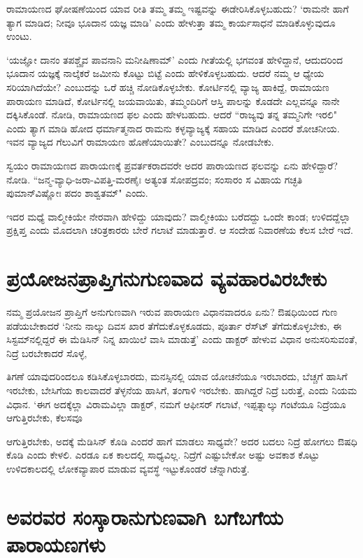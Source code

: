 ರಾಮಾಯಣದ ಘೋಷಣೆಯಿಂದ ಯಾವ ರೀತಿ ತಮ್ಮ ತಮ್ಮ ಇಷ್ಟವನ್ನು ಈಡೇರಿಸಿಕೊಳ್ಳಬಹುದು? `ರಾಮನೇ ಹಾಗೆ ತ್ಯಾಗ ಮಾಡಿದ; ನೀವೂ ಭೂದಾನ ಯಜ್ಞ ಮಾಡಿ' ಎಂದು ಹೇಳುತ್ತಾ ತಮ್ಮ ಕಾರ್ಯಸಾಧನೆ ಮಾಡಿಕೊಳ್ಳುವುದೂ ಉಂಟು. 

`ಯಜ್ಞೋ ದಾನಂ ತಪಶ್ಚೈವ\label{172} ಪಾವನಾನಿ ಮನೀಷಿಣಾಮ್‍' ಎಂದು ಗೀತೆಯಲ್ಲಿ ಭಗವಂತ ಹೇಳಿದ್ದಾನೆ, ಆದುದರಿಂದ ಭೂದಾನ ಯಜ್ಞಕ್ಕೆ ನಾಲ್ಕೆಕರೆ ಜಮೀನು ಕೊಟ್ಟು ಬಿಟ್ಟೆ ಎಂದು ಹೇಳಿಕೊಳ್ಳಬಹುದು. ಆದರೆ ನಮ್ಮ ಆ ಧ್ಯೇಯ ಸರಿಯಾಗಿದೆಯೇ? ಎಂಬುದನ್ನು ಒರೆ ಹಚ್ಚಿ ನೋಡಿಕೊಳ್ಳಬೇಕು. ಕೋರ್ಟಿನಲ್ಲಿ ವ್ಯಾಜ್ಯ ಹಾಕಿದ್ದೆ, ರಾಮಾಯಣ ಪಾರಾಯಣ ಮಾಡಿದೆ, ಕೋರ್ಟಿನಲ್ಲಿ ಜಯವಾಯಿತು, ತಮ್ಮಂದಿರಿಗೆ ಆಸ್ತಿ ಪಾಲನ್ನು ಕೊಡದೇ ಎಲ್ಲವನ್ನೂ ನಾನೇ ದಕ್ಕಿಸಿಕೊಂಡೆ. ನೋಡಿ, ರಾಮಾಯಣದ ಫಲ ಎಂದು ಹೇಳಬಹುದು. ಆದರೆ ``ರಾಜ್ಯವು ತನ್ನ ತಮ್ಮನಿಗೇ ಇರಲಿ" ಎಂದು ತ್ಯಾಗ ಮಾಡಿ ಹೋದ ಧರ್ಮಾತ್ಮನಾದ ರಾಮನು ಕಳ್ಳವ್ಯಾಜ್ಯಕ್ಕೆ ಸಹಾಯ ಮಾಡಿದ ಎಂದರೆ ಶೋಚನೀಯ. ಇವನ ವ್ಯಾಜ್ಯದ ಗೆಲುವಿಗೆ ರಾಮಾಯಣ ಹೊಣೆಯಾಯಿತೇ? ಎಂಬುದನ್ನೂ ನೋಡಬೇಕು. 


ಸ್ವಯಂ ರಾಮಾಯಣದ ಪಾರಾಯಣಕ್ಕೆ ಪ್ರವರ್ತಕರಾದವರೇ ಅದರ ಪಾರಾಯಣದ ಫಲವನ್ನು ಏನು ಹೇಳಿದ್ದಾರೆ? ನೋಡಿ. ``ಜನ್ಮ-ವ್ಯಾಧಿ-ಜರಾ-ವಿಪತ್ತಿ-ಮರಣೈಃ \label{173} ಅತ್ಯಂತ ಸೋಪದ್ರವಂ; ಸಂಸಾರಂ ಸ ವಿಹಾಯ ಗಚ್ಛತಿ ಪುಮಾನ್‍ವಿಷ್ಣೋಃ ಪದಂ ಶಾಶ್ವತಮ್‍" ಎಂದು. 


ಇದರ ಮಧ್ಯೆ ವಾಲ್ಮೀಕಿಯೇ ನೇರವಾಗಿ ಹೇಳಿದ್ದು ಯಾವುದು? ವಾಲ್ಮೀಕಿಯು ಬರೆದದ್ದು ಒಂದೇ ಕಾಂಡ; ಉಳಿದದ್ದೆಲ್ಲಾ ಪ್ರಕ್ಷಿಪ್ತ ಎಂದು ಮೊದಲಾಗಿ ಚರಿತ್ರಕಾರರು ಬೇರೆ ಗಲಾಟೆ ಮಾಡುತ್ತಾರೆ. ಆ ಸಂದೇಹ ನಿವಾರಣೆಯ ಕೆಲಸ ಬೇರೆ ಇದೆ. 


\section*{ಪ್ರಯೋಜನಪ್ರಾಪ್ತಿಗನುಗುಣವಾದ ವ್ಯವಹಾರವಿರಬೇಕು} 


ನಮ್ಮ ಪ್ರಯೋಜನ ಪ್ರಾಪ್ತಿಗೆ ಅನುಗುಣವಾಗಿ ಇರುವ ಪಾರಾಯಣ ವಿಧಾನವಾದರೂ ಏನು? ಔಷಧಿಯಿಂದ ಗುಣ ಪಡೆಯಬೇಕಾದರೆ `ನೀನು ನಾಲ್ಕು ದಿವಸ ಖಾರ ತೆಗೆದುಕೊಳ್ಳಕೂಡದು, ಪೂರ್ತಾ ರೆಸ್ಟ್‍ ತೆಗೆದುಕೊಳ್ಳಬೇಕು, ಈ ಸಿಸ್ಟಮ್‍ನಲ್ಲಿದ್ದರೆ ಈ ಮೆಡಿಸಿನ್‍ ನಿನ್ನ ಖಾಯಿಲೆ ವಾಸಿ ಮಾಡುತ್ತೆ' ಎಂದು ಡಾಕ್ಟರ್‍ ಹೇಳುವ ವಿಧಾನ ಅನುಸರಿಸುವಂತೆ, ನಿದ್ರೆ ಬರಬೇಕಾದರೆ ಸೊಳ್ಳೆ, 

ತಿಗಣೆ ಯಾವುದರಿಂದಲೂ ಕಡಿಸಿಕೊಳ್ಳಬಾರದು, ಮನಸ್ಸಿನಲ್ಲಿ ಯಾವ ಯೋಚನೆಯೂ ಇರಬಾರದು, ಬೆಚ್ಚಗೆ ಹಾಸಿಗೆ ಇರಬೇಕು, ಬೇಸಿಗೆಯ ಕಾಲವಾದರೆ ತೆಳ್ಳನೆಯ ಹಾಸಿಗೆ, ತಂಗಾಳಿ ಇರಬೇಕು. ಹಾಗಿದ್ದರೆ ನಿದ್ರೆ ಬರುತ್ತೆ, ಎಂದು ನಿಯಮ ವಿಧಾನ. `ಈಗ ಅದಕ್ಕೆಲ್ಲಾ ವಿರಾಮವಿಲ್ಲಾ ಡಾಕ್ಟರ್‍, ನಮಗೆ ಆಫೀಸರ್‍ ಗಲಾಟೆ, ಇಪ್ಪತ್ನಾಲ್ಕು ಗಂಟೆಯೂ ನಿದ್ರೆಯೂ ಆಗುತ್ತಿರಬೇಕು, ಕೆಲಸವೂ 

ಆಗುತ್ತಿರಬೇಕು, ಅದಕ್ಕೆ ಮೆಡಿಸಿನ್‍ ಕೊಡಿ ಎಂದರೆ ಹಾಗೆ ಮಾಡಲು ಸಾಧ್ಯವೇ? ಅದರ ಬದಲು ನಿದ್ರೆ ಹೋಗಲು ಔಷಧಿ ಕೊಡಿ ಎಂದು ಕೇಳಲಿ. ಎರಡೂ ಏಕ ಕಾಲದಲ್ಲಿ ಸಾಧ್ಯವಿಲ್ಲ. ನಿದ್ರೆಗೆ ಎಷ್ಟುಬೇಕೋ ಅಷ್ಟು ಅವಕಾಶ ಕೊಟ್ಟು ಉಳಿದಕಾಲದಲ್ಲಿ ಲೋಕವ್ಯಾಪಾರ ಮಾಡುವ ವ್ಯವಸ್ಥೆ ಇಟ್ಟುಕೊಂಡರೆ ಚೆನ್ನಾಗಿರುತ್ತೆ. 


\section*{ಅವರವರ ಸಂಸ್ಕಾರಾನುಗುಣವಾಗಿ ಬಗೆಬಗೆಯ ಪಾರಾಯಣಗಳು} 


